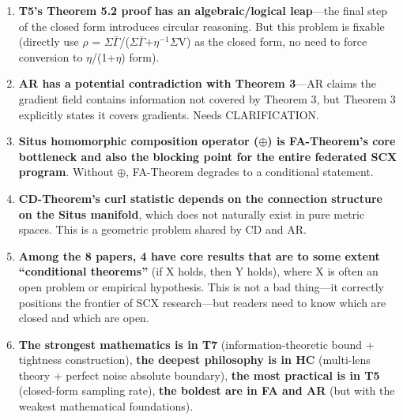 \documentclass[
  12pt,
]{article}
\begin{document}
\begin{enumerate}
\def\labelenumi{\arabic{enumi}.}
\item
  \textbf{T5's Theorem 5.2 proof has an algebraic/logical leap}---the final step of the closed form introduces circular reasoning. But this problem is fixable (directly use $\rho$ = $\Sigma\bar{\Gamma}$/($\Sigma\bar{\Gamma}$+$\eta^{-1}\Sigma$V) as the closed form, no need to force conversion to $\eta$/(1+$\eta$) form).
\item
  \textbf{AR has a potential contradiction with Theorem 3}---AR claims the gradient field contains information not covered by Theorem 3, but Theorem 3 explicitly states it covers gradients. Needs CLARIFICATION.
\item
  \textbf{Situs homomorphic composition operator ($\oplus$) is FA-Theorem's core bottleneck and also the blocking point for the entire federated SCX program}. Without $\oplus$, FA-Theorem degrades to a conditional statement.
\item
  \textbf{CD-Theorem's curl statistic depends on the connection structure on the Situs manifold}, which does not naturally exist in pure metric spaces. This is a geometric problem shared by CD and AR.
\item
  \textbf{Among the 8 papers, 4 have core results that are to some extent ``conditional theorems''} (if X holds, then Y holds), where X is often an open problem or empirical hypothesis. This is not a bad thing---it correctly positions the frontier of SCX research---but readers need to know which are closed and which are open.
\item
  \textbf{The strongest mathematics is in T7} (information-theoretic bound + tightness construction), \textbf{the deepest philosophy is in HC} (multi-lens theory + perfect noise absolute boundary), \textbf{the most practical is in T5} (closed-form sampling rate), \textbf{the boldest are in FA and AR} (but with the weakest mathematical foundations).
\end{enumerate}
\end{document}
